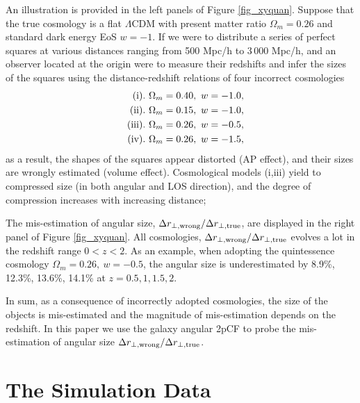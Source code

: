 \documentclass[iop]{emulateapj}
\begin{document}
An illustration is provided in the left panels of Figure \ref{fig_xyquan}.
Suppose that the true cosmology is a flat $\Lambda$CDM with present matter ratio $\Omega_m=0.26$
and standard dark energy EoS $w=-1$.
If we were to distribute a series of perfect squares at various distances ranging from 500 Mpc/h to 3\,000 Mpc/h,
and an observer located at the origin were to measure their redshifts and infer the sizes of the squares
using the distance-redshift relations of four incorrect cosmologies
\begin{eqnarray}
 & &{\rm (i)}.\ \Omega_m=0.40,\ w=-1.0, \nonumber \\ 
 & &{\rm (ii)}.\ \Omega_m=0.15,\ w=-1.0, \nonumber\\ \noindent
 & &{\rm (iii)}.\ \Omega_m=0.26,\ w=-0.5,\nonumber\\ \noindent
 & &{\rm (iv)}.\ \Omega_m=0.26,\ w=-1.5,  \nonumber \noindent 
\end{eqnarray}
as a result, 
the shapes of the squares appear distorted (AP effect),
and their sizes are wrongly estimated (volume effect).
Cosmological models (i,iii) yield to compressed size (in both angular and LOS direction),
and the degree of compression increases with increasing distance;

The mis-estimation of angular size, ${\Delta r_{\perp, \rm wrong}}/{\Delta r_{\perp, \rm true}}$, 
are displayed in the right panel of Figure \ref{fig_xyquan}.
All cosmologies, ${\Delta r_{\perp, \rm wrong}}/{\Delta r_{\perp, \rm true}}$ evolves a lot in the redshift range $0<z<2$.
As an example, when adopting the quintessence cosmology $\Omega_m=0.26,\ w=-0.5$,
the angular size is underestimated by 
8.9\%, 12.3\%, 13.6\%, 14.1\% 
at $z=0.5,1,1.5,2$.


In sum, as a consequence of incorrectly adopted cosmologies, 
the size of the objects is mis-estimated and the magnitude of mis-estimation depends on the redshift.
In this paper we use the galaxy angular 2pCF to probe the mis-estimation of angular size ${\Delta r_{\perp, \rm wrong}}/{\Delta r_{\perp, \rm true}}$.


\section{The Simulation Data}\label{sec:data}
\end{document}
